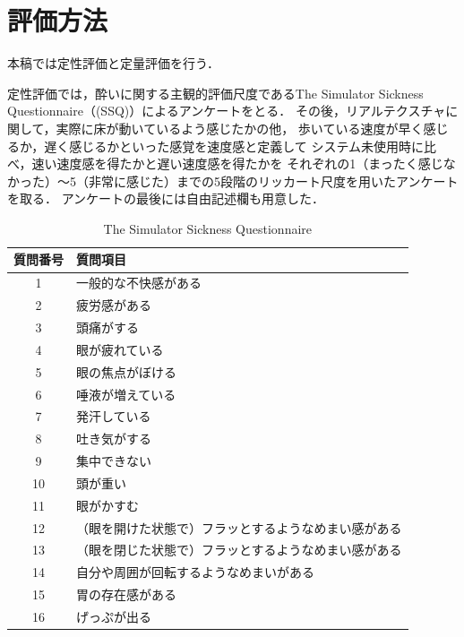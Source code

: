 \section{評価方法}
本稿では定性評価と定量評価を行う．


定性評価では，酔いに関する主観的評価尺度であるThe Simulator Sickness Questionnaire（(SSQ)）によるアンケートをとる\cite{ssq}．
その後，リアルテクスチャに関して，実際に床が動いているよう感じたかの他，
歩いている速度が早く感じるか，遅く感じるかといった感覚を速度感と定義して
システム未使用時に比べ，速い速度感を得たかと遅い速度感を得たかを
それぞれの1（まったく感じなかった）～5（非常に感じた）までの5段階のリッカート尺度を用いたアンケートを取る．
アンケートの最後には自由記述欄も用意した．
\begin{table}[h]
    \begin{center}
        \caption{The Simulator Sickness Questionnaire} \label{tab:SSQ}
        \begin{tabular}{c|l}\hline\hline
            質問番号 & 質問項目                                             \\\hline
            1        & 一般的な不快感がある                                 \\
            2        & 疲労感がある                                         \\
            3        & 頭痛がする                                           \\
            4        & 眼が疲れている                                       \\
            5        & 眼の焦点がぼける                                     \\
            6        & 唾液が増えている                                     \\
            7        & 発汗している                                         \\
            8        & 吐き気がする                                         \\
            9        & 集中できない                                         \\
            10       & 頭が重い                                             \\
            11       & 眼がかすむ                                           \\
            12       & （眼を開けた状態で）フラッとするようなめまい感がある \\
            13       & （眼を閉じた状態で）フラッとするようなめまい感がある \\
            14       & 自分や周囲が回転するようなめまいがある               \\
            15       & 胃の存在感がある                                     \\
            16       & げっぷが出る                                         \\\hline
        \end{tabular}
    \end{center}
\end{table}


